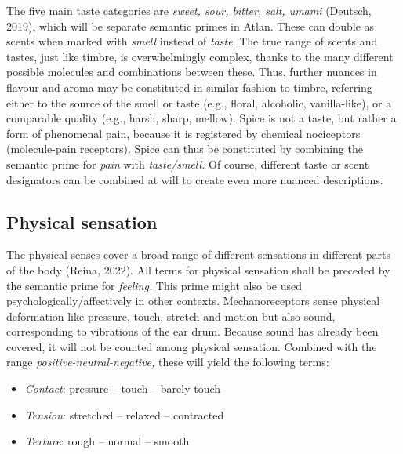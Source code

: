 The five main taste categories are \textit{sweet, sour, bitter, salt, umami}  (Deutsch, 2019), which will be separate semantic primes in Atlan. These can double as scents when marked with \textit{smell} instead of \textit{taste}. The true range of scents and tastes, just like timbre, is overwhelmingly complex, thanks to the many different possible molecules and combinations between these. Thus, further nuances in flavour and aroma may be constituted in similar fashion to timbre, referring either to the source of the smell or taste (e.g., floral, alcoholic, vanilla-like), or a comparable quality (e.g., harsh, sharp, mellow). Spice is not a taste, but rather a form of phenomenal pain, because it is registered by chemical nociceptors (molecule-pain receptors). Spice can thus be constituted by combining the semantic prime for \textit{pain} with \textit{taste/smell.} Of course, different taste or scent designators can be combined at will to create even more nuanced descriptions. 

\vfill

\subsection{Physical sensation}

The physical senses cover a broad range of different sensations in different parts of the body (Reina, 2022). All terms for physical sensation shall be preceded by the semantic prime for \textit{feeling.} This prime might also be used psychologically/affectively in other contexts. Mechanoreceptors sense physical deformation like pressure, touch, stretch and motion but also sound, corresponding to vibrations of the ear drum. Because sound has already been covered, it will not be counted among physical sensation. Combined with the range \textit{positive-neutral-negative,} these will yield the following terms:  

\begin{itemize}
\item   \textit{Contact}: pressure – touch – barely touch  

\item   \textit{Tension}: stretched – relaxed – contracted  

\item   \textit{Texture}: rough – normal – smooth 
\end{itemize}

